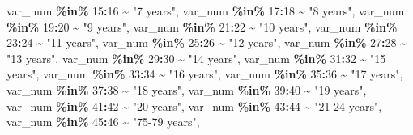 \documentclass[
]{article}
\newenvironment{Shaded}{\begin{snugshade}}{\end{snugshade}}
\newcommand{\DecValTok}[1]{\textcolor[rgb]{0.00,0.00,0.81}{#1}}
\newcommand{\NormalTok}[1]{#1}
\newcommand{\SpecialCharTok}[1]{\textcolor[rgb]{0.81,0.36,0.00}{\textbf{#1}}}
\newcommand{\StringTok}[1]{\textcolor[rgb]{0.31,0.60,0.02}{#1}}
\begin{document}
\begin{Shaded}
\begin{Highlighting}[]
\NormalTok{      var\_num }\SpecialCharTok{\%in\%} \DecValTok{15}\SpecialCharTok{:}\DecValTok{16} \SpecialCharTok{\textasciitilde{}} \StringTok{"7 years"}\NormalTok{,}
\NormalTok{      var\_num }\SpecialCharTok{\%in\%} \DecValTok{17}\SpecialCharTok{:}\DecValTok{18} \SpecialCharTok{\textasciitilde{}} \StringTok{"8 years"}\NormalTok{,}
\NormalTok{      var\_num }\SpecialCharTok{\%in\%} \DecValTok{19}\SpecialCharTok{:}\DecValTok{20} \SpecialCharTok{\textasciitilde{}} \StringTok{"9 years"}\NormalTok{,}
\NormalTok{      var\_num }\SpecialCharTok{\%in\%} \DecValTok{21}\SpecialCharTok{:}\DecValTok{22} \SpecialCharTok{\textasciitilde{}} \StringTok{"10 years"}\NormalTok{,}
\NormalTok{      var\_num }\SpecialCharTok{\%in\%} \DecValTok{23}\SpecialCharTok{:}\DecValTok{24} \SpecialCharTok{\textasciitilde{}} \StringTok{"11 years"}\NormalTok{,}
\NormalTok{      var\_num }\SpecialCharTok{\%in\%} \DecValTok{25}\SpecialCharTok{:}\DecValTok{26} \SpecialCharTok{\textasciitilde{}} \StringTok{"12 years"}\NormalTok{,}
\NormalTok{      var\_num }\SpecialCharTok{\%in\%} \DecValTok{27}\SpecialCharTok{:}\DecValTok{28} \SpecialCharTok{\textasciitilde{}} \StringTok{"13 years"}\NormalTok{,}
\NormalTok{      var\_num }\SpecialCharTok{\%in\%} \DecValTok{29}\SpecialCharTok{:}\DecValTok{30} \SpecialCharTok{\textasciitilde{}} \StringTok{"14 years"}\NormalTok{,}
\NormalTok{      var\_num }\SpecialCharTok{\%in\%} \DecValTok{31}\SpecialCharTok{:}\DecValTok{32} \SpecialCharTok{\textasciitilde{}} \StringTok{"15 years"}\NormalTok{,}
\NormalTok{      var\_num }\SpecialCharTok{\%in\%} \DecValTok{33}\SpecialCharTok{:}\DecValTok{34} \SpecialCharTok{\textasciitilde{}} \StringTok{"16 years"}\NormalTok{,}
\NormalTok{      var\_num }\SpecialCharTok{\%in\%} \DecValTok{35}\SpecialCharTok{:}\DecValTok{36} \SpecialCharTok{\textasciitilde{}} \StringTok{"17 years"}\NormalTok{,}
\NormalTok{      var\_num }\SpecialCharTok{\%in\%} \DecValTok{37}\SpecialCharTok{:}\DecValTok{38} \SpecialCharTok{\textasciitilde{}} \StringTok{"18 years"}\NormalTok{,}
\NormalTok{      var\_num }\SpecialCharTok{\%in\%} \DecValTok{39}\SpecialCharTok{:}\DecValTok{40} \SpecialCharTok{\textasciitilde{}} \StringTok{"19 years"}\NormalTok{,}
\NormalTok{      var\_num }\SpecialCharTok{\%in\%} \DecValTok{41}\SpecialCharTok{:}\DecValTok{42} \SpecialCharTok{\textasciitilde{}} \StringTok{"20 years"}\NormalTok{,}
\NormalTok{      var\_num }\SpecialCharTok{\%in\%} \DecValTok{43}\SpecialCharTok{:}\DecValTok{44} \SpecialCharTok{\textasciitilde{}} \StringTok{"21{-}24 years"}\NormalTok{,}
\NormalTok{      var\_num }\SpecialCharTok{\%in\%} \DecValTok{45}\SpecialCharTok{:}\DecValTok{46} \SpecialCharTok{\textasciitilde{}} \StringTok{"75{-}79 years"}\NormalTok{,}

\end{Highlighting}
\end{Shaded}
\end{document}
